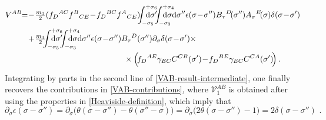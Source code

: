 \documentclass[12pt]{article}
\numberwithin{equation}{section}
\begin{document}
\begin{align}\label{VAB-result-intermediate}
V^{AB}\!\!=& \!-\!\tfrac{m_{3}}{2}(f_{D}{}^{AC}f^{B}{}_{CE}\!-\!f_{D}{}^{BC}f^{A}{}_{CE})\!\!\!\int_{-\sigma_{5}}^{+\sigma_{6}}\!\!\!\!\!\!\!\!\!\!\mathrm{d}\sigma' \!\!\! \int_{-\sigma_{3}}^{+\sigma_{4}}\!\!\!\!\!\!\!\!\!\!\mathrm{d}\sigma\mathrm{d}\sigma''  \epsilon(\sigma\!-\!\sigma'')B_{\tau}{}^{D}\!(\sigma'')A_{\sigma}{}^{E}\!(\sigma)\delta(\sigma\!-\!\sigma')
\notag \\
& \!+\!\tfrac{m_{4}}{2}\!\!\!\int_{-\sigma_{5}}^{+\sigma_{6}}\!\!\!\!\!\!\!\!\!\!\mathrm{d}\sigma' \!\!\! \int_{-\sigma_{3}}^{+\sigma_{4}}\!\!\!\!\!\!\!\!\!\!\mathrm{d}\sigma\mathrm{d}\sigma''   \epsilon(\sigma\!-\!\sigma'')B_{\tau}{}^{D}(\sigma'')\partial_{\sigma}\delta(\sigma\!-\!\sigma') \times
\notag \\
& \qquad \qquad \qquad \qquad\qquad \qquad \times \Bigl(\!f_{D}{}^{AE}\gamma_{EC}C^{CB}(\sigma')\!-\!f_{D}{}^{BE}\gamma_{EC}C^{CA}(\sigma')\!\Bigr) \, .
\end{align}
Integrating by parts in the second line of \eqref{VAB-result-intermediate}, one finally recovers the contributions in \eqref{VAB-contributions}, where $\mathcal{V}_{1}^{AB}$ is obtained after using the properties in \eqref{Heaviside-definition}, which imply that
\begin{equation}
\partial_{\sigma}\epsilon(\sigma-\sigma'')=\partial_{\sigma}\bigl( \theta(\sigma-\sigma'')-\theta(\sigma''-\sigma)\bigr)=\partial_{\sigma}\bigl(2\theta(\sigma-\sigma'')-1 \bigr)=2\delta(\sigma-\sigma'') \,\, .
\end{equation}
\end{document}
